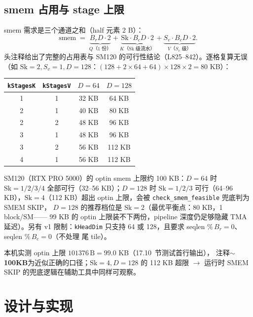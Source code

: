 \subsection{smem 占用与 stage 上限}

smem 需求是三个通道之和（half 元素 2 B）：
\begin{equation}
  \mathrm{smem} \;=\; \underbrace{B_r D \cdot 2}_{Q\text{（1 份）}}
  + \underbrace{\mathrm{Sk} \cdot B_c D \cdot 2}_{K\text{（Sk 级流水）}}
  + \underbrace{S_v \cdot B_c D \cdot 2}_{V\text{（}S_v\text{ 级）}} .
  \label{eq:17-qbytes}
\end{equation}
头注释给出了完整的占用表与 SM120 的可行性结论（L825--842）。逐格复算无误
（如 $\mathrm{Sk}{=}2, S_v{=}1, D{=}128$：$(128 + 2 \times 64 + 64) \times 128
\times 2 = 80$ KB）：

\begin{center}
\begin{tabular}{cccc}
\toprule
\texttt{kStagesK} & \texttt{kStagesV} & $D{=}64$ & $D{=}128$ \\
\midrule
1 & 1 & 32 KB & 64 KB \\
2 & 1 & 40 KB & 80 KB \\
2 & 2 & 48 KB & 96 KB \\
3 & 1 & 48 KB & 96 KB \\
3 & 2 & 56 KB & 112 KB \\
4 & 1 & 56 KB & 112 KB \\
\bottomrule
\end{tabular}
\end{center}

SM120（RTX PRO 5000）的 optin smem 上限约 100 KB：$D{=}64$ 时
$\mathrm{Sk} = 1/2/3/4$ 全部可行（32--56 KB）；$D{=}128$ 时
$\mathrm{Sk} = 1/2/3$ 可行（64--96 KB），$\mathrm{Sk}{=}4$（112 KB）超出
optin 上限，会被 \texttt{check\_smem\_feasible} 兜底判为 SMEM SKIP，
$D{=}128$ 的推荐档位是 $\mathrm{Sk}{=}2$（最优平衡点：80 KB，1 block/SM——
99 KB 的 optin 上限装不下两份，pipeline 深度仍足够隐藏 TMA 延迟）。另有 v1 限制：\texttt{kHeadDim} 只支持
64 或 128，且要求 seqlen $\%\, B_r = 0$、seqlen $\%\, B_c = 0$（不处理
尾 tile）。

本机实测 optin 上限 $101376\,\mathrm{B} = 99.0$ KB（17.10~节测试首行输出），
注释\textbf{$\sim$100KB}为近似正确的口径；$\mathrm{Sk}{=}4, D{=}128$ 的 112 KB
超限 $\to$ 运行时 SMEM SKIP 的兜底逻辑在辅助工具中同样可观察。

\section{设计与实现}

